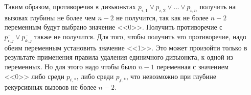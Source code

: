 \documentclass[10pt,a4paper]{article}
\begin{document}
Таким образом, противоречия в дизъюнктах $p_{i,1} \vee p_{i,2} \vee \dots \vee p_{i,n}$ получить на вызовах
глубины не более чем $n-2$ не получится, так как не более $n-2$ переменным будут выбрано значение <<0>>.
Получить противоречие с $\overline{p_{i,j}} \vee \overline{p_{k,j}}$ также не получится.
Для того, чтобы получить это противоречие, надо обеим переменным установить значение <<1>>.
Это может произойти только в результате применения правила удаления единичного дизъюнкта,
к одной из переменных. Но для этого надо чтобы было $n-1$ переменная с значением <<0>> либо
среди $p_{i,*}$, либо среди $p_{j,*}$, что невозможно при глубине рекурсивных вызовов не более
$n-2$. 
\end{document}
